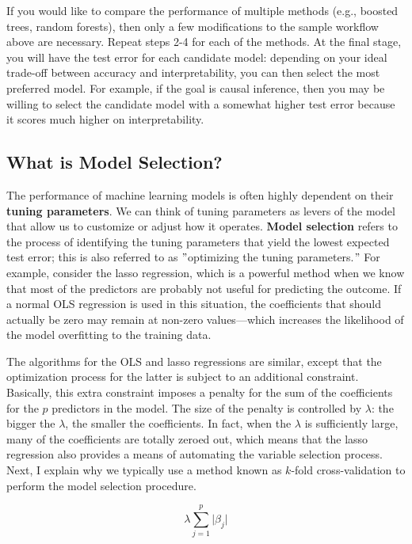 \documentclass{book}
\begin{document}
If you would like to compare the performance of multiple methods (e.g.,
boosted trees, random forests), then only a few modifications to the sample
workflow above are necessary. Repeat steps 2-4 for each of the methods. At the
final stage, you will have the test error for each candidate model: depending
on your ideal trade-off between accuracy and interpretability, you can then
select the most preferred model. For example, if the goal is causal inference,
then you may be willing to select the candidate model with a somewhat higher
test error because it scores much higher on interpretability.

\hypertarget{what-is-model-selection}{%
\subsection{What is Model Selection?}\label{what-is-model-selection}}

The performance of machine learning models is often highly dependent on their
\textbf{tuning parameters}. We can think of tuning parameters as levers of the
model that allow us to customize or adjust how it operates. \textbf{Model
selection} refers to the process of identifying the tuning parameters that
yield the lowest expected test error; this is also referred to as
\("\)optimizing the tuning parameters.\("\) For example, consider the lasso
regression, which is a powerful method when we know that most of the
predictors are probably not useful for predicting the outcome. If a normal OLS
regression is used in this situation, the coefficients that should actually be
zero may remain at non-zero values---which increases the likelihood of the
model overfitting to the training data.

The algorithms for the OLS and lasso regressions are similar, except that the
optimization process for the latter is subject to an additional constraint.
Basically, this extra constraint imposes a penalty for the sum of the
coefficients for the \(p\) predictors in the model. The size of the penalty is
controlled by \(\lambda\): the bigger the \(\lambda\), the smaller the
coefficients. In fact, when the \(\lambda\) is sufficiently large, many of the
coefficients are totally zeroed out, which means that the lasso regression
also provides a means of automating the variable selection process. Next, I
explain why we typically use a method known as \(k\)-fold cross-validation to
perform the model selection procedure.

\[\lambda  \sum _{j=1}^{p} \vert  \beta _{j} \vert\]
\end{document}
